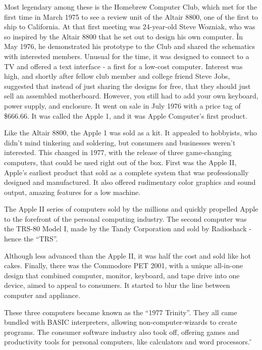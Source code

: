 Most legendary among these is the Homebrew Computer Club, which met for the first time in March 1975 to see a review
unit of the Altair 8800, one of the first to ship to California. At that first meeting was 24-year-old Steve Wozniak,
who was so inspired by the Altair 8800 that he set out to design his own computer. \v

In May 1976, he demonstrated his prototype to the Club and shared the schematics with interested members. Unusual for
the time, it was designed to connect to a TV and offered a text interface - a first for a low-cost computer. Interest
was high, and shortly after fellow club member and college friend Steve Jobs, suggested that instead of just sharing
the designs for free, that they should just sell an assembled motherboard. However, you still had to add your own
keyboard, power supply, and enclosure. It went on sale in July 1976 with a price tag of \$666.66. It was called the
Apple 1, and it was Apple Computer's first product.


Like the Altair 8800, the Apple 1 was sold as a kit. It appealed to hobbyists, who didn't mind tinkering and
soldering, but consumers and businesses weren't interested. This changed in 1977, with the release of three
game-changing computers, that could be used right out of the box. First was the Apple II, Apple's earliest product
that sold as a complete system that was professionally designed and manufactured. It also offered rudimentary color
graphics and sound output, amazing features for a low machine.


The Apple II series of computers sold by the millions and quickly propelled Apple to the forefront of the personal
computing industry. The second computer was the TRS-80 Model I, made by the Tandy Corporation and sold by Radioshack
- hence the ``TRS''.


Although less advanced than the Apple II, it was half the cost and sold like hot cakes. Finally, there was the
Commodore PET 2001, with a unique all-in-one design that combined computer, monitor, keyboard, and tape drive into
one device, aimed to appeal to consumers. It started to blur the line between computer and appliance.


These three computers became known as the ``1977 Trinity''. They all came bundled with BASIC interpreters, allowing
non-computer-wizards to create programs. The consumer software industry also took off, offering games and
productivity tools for personal computers, like calculators and word processors. \v

